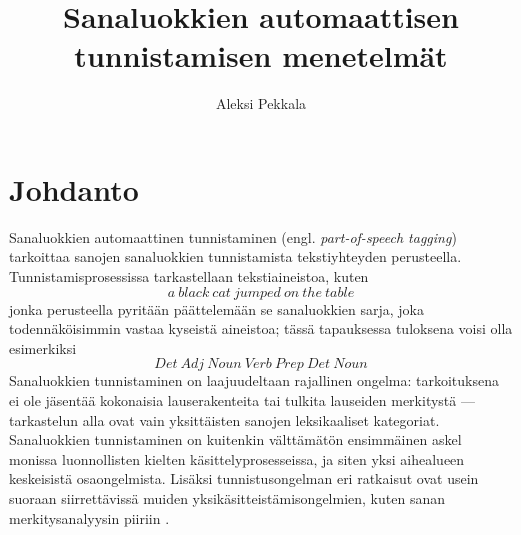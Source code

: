 \documentclass[utf8,bachelor,manualbib]{gradu3}
\begin{document}
\title{Sanaluokkien automaattisen tunnistamisen menetelmät}



\author{Aleksi Pekkala}

\maketitle
  
\mainmatter


\chapter{Johdanto}


Sanaluokkien automaattinen tunnistaminen (engl. \emph{part-of-speech tagging}) tarkoittaa sanojen sanaluokkien tunnistamista tekstiyhteyden perusteella.  Tunnistamisprosessissa tarkastellaan tekstiaineistoa, kuten
\[a\:black\:cat\:jumped\:on\:the\:table\]
jonka perusteella pyritään päättelemään se sanaluokkien sarja, joka todennäköisimmin vastaa kyseistä aineistoa; tässä tapauksessa tuloksena voisi olla esimerkiksi
\[Det\:Adj\:Noun\:Verb\:Prep\:Det\:Noun\]
Sanaluokkien tunnistaminen on laajuudeltaan rajallinen ongelma: tarkoituksena ei ole jäsentää kokonaisia lauserakenteita tai tulkita lauseiden merkitystä --- tarkastelun alla ovat vain yksittäisten sanojen leksikaaliset kategoriat. Sanaluokkien tunnistaminen on kuitenkin välttämätön ensimmäinen askel monissa luonnollisten kielten käsittelyprosesseissa, ja siten yksi aihealueen keskeisistä osaongelmista. Lisäksi tunnistusongelman eri ratkaisut ovat usein suoraan siirrettävissä muiden yksikäsitteistämisongelmien, kuten sanan merkitysanalyysin piiriin \citep{brill1995}.
\end{document}
